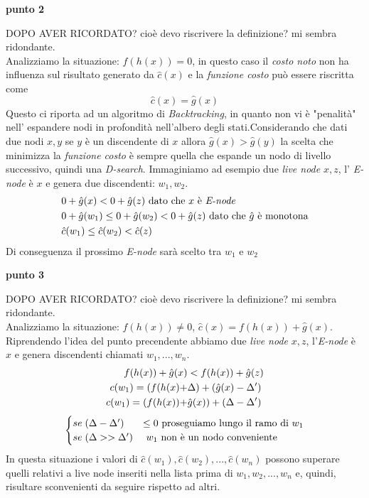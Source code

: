 \documentclass[a4paper]{article}
\begin{document}
\textbf{punto 2}
\begin{adjustwidth}{.8cm}{0cm}
DOPO AVER RICORDATO? cioè devo riscrivere la definizione? mi sembra ridondante.\\
Analizziamo la situazione: $f(h(x)) =0$, in questo caso il \textit{costo noto} non ha influenza sul risultato generato da $\hat c(x)$ e la \textit{funzione costo} può essere riscritta come $$\hat c(x) = \hat g(x)$$
Questo ci riporta ad un algoritmo di \textit{Backtracking}, in quanto non vi è "penalità" nell' espandere nodi in profondità nell'albero degli stati.Considerando che dati due nodi $x,y$ se $y$ è un discendente di $x$ allora $\hat g(x) > \hat g(y)$ la scelta che minimizza la \textit{funzione costo} è sempre quella che espande un nodo di livello successivo, quindi una \textit{D-search}.
Immaginiamo ad esempio due \textit{live node} $x,z$, l' \textit{E-node} è $x$ e genera due discendenti: $w_1, w_2$.
		\begin{align}
			&0 + \hat g(x) < 0 + \hat g(z) \text{ dato che $x$ è \textit{E-node}} \notag \\
			&0 + \hat g(w_1) \leq 0 + \hat g(w_2) < 0 + \hat g(z) \text{ dato che $\hat g$ è monotona} \notag\\
			&\hat c(w_1) \leq \hat c(w_2) < \hat c(z) \notag
	        \end{align}
		Di conseguenza il prossimo \textit{E-node} sarà scelto tra $w_1$ e $w_2$
\end{adjustwidth}
\textbf{punto 3}
\begin{adjustwidth}{.8cm}{0cm}
DOPO AVER RICORDATO? cioè devo riscrivere la definizione? mi sembra ridondante.\\
Analizziamo la situazione: $f(h(x)) \neq 0$, $\hat c(x) = f(h(x)) + \hat g(x)$.\\
Riprendendo l'idea del punto precendente abbiamo due \textit{live node} $x,z$, l'\textit{E-node} è $x$ e genera discendenti chiamati $w_1,..., w_n$.
\begin{align}        
	f(h(x)) + \hat g(x) &< f(h(x)) + \hat g(z) \notag \\
	c(w_1) = (f(h(x) + &\Delta) + (\hat g(x) - \Delta') \notag \\
	c(w_1) = (f(h(x)) + &\hat g(x)) + (\Delta - \Delta') \notag
	\end{align}
	\begin{equation}
	\begin{cases}
		se \; (\Delta - \Delta') &\leq 0 \text{ proseguiamo lungo il ramo di $w_1$} \notag \\
		se \; (\Delta >> \Delta') &\text{ $w_1$ non è un nodo conveniente} \notag
	\end{cases}
	\end{equation}
In questa situazione i valori di $\hat c(w_1), \hat c(w_2), . . . , \hat c(w_n)$ possono superare quelli relativi a live node inseriti nella lista prima di $w_1, w_2, . . . , w_n$ e, quindi, risultare sconvenienti da seguire rispetto ad altri.
\end{adjustwidth}
\end{document}
